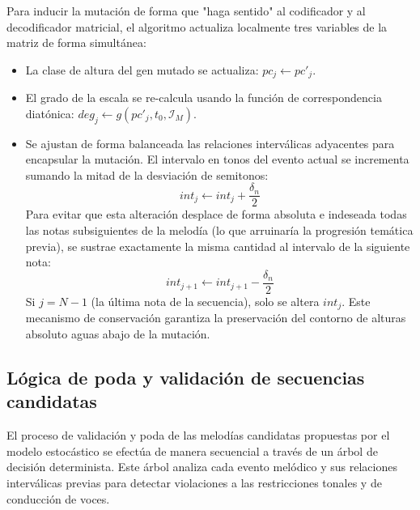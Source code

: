 \documentclass[12pt]{report}
\begin{document}
\begin{enumerate}
    Para inducir la mutación de forma que "haga sentido" al codificador y al decodificador matricial, el algoritmo actualiza localmente tres variables de la matriz de forma simultánea:
    \begin{itemize}
        \item La clase de altura del gen mutado se actualiza: $pc_j \leftarrow pc'_j$.
        \item El grado de la escala se re-calcula usando la función de correspondencia diatónica: $deg_j \leftarrow g(pc'_j, t_0, \mathcal{I}_M)$.
        \item Se ajustan de forma balanceada las relaciones interválicas adyacentes para encapsular la mutación. El intervalo en tonos del evento actual se incrementa sumando la mitad de la desviación de semitonos:
        \begin{equation}
            int_j \leftarrow int_j + \frac{\delta_n}{2}
        \end{equation}
        Para evitar que esta alteración desplace de forma absoluta e indeseada todas las notas subsiguientes de la melodía (lo que arruinaría la progresión temática previa), se sustrae exactamente la misma cantidad al intervalo de la siguiente nota:
        \begin{equation}
            int_{j+1} \leftarrow int_{j+1} - \frac{\delta_n}{2}
        \end{equation}
        Si $j = N-1$ (la última nota de la secuencia), solo se altera $int_j$. Este mecanismo de conservación garantiza la preservación del contorno de alturas absoluto aguas abajo de la mutación.
    \end{itemize}
\end{enumerate}

\subsection{Lógica de poda y validación de secuencias candidatas}

El proceso de validación y poda de las melodías candidatas propuestas por el modelo estocástico se efectúa de manera secuencial a través de un árbol de decisión determinista. Este árbol analiza cada evento melódico y sus relaciones interválicas previas para detectar violaciones a las restricciones tonales y de conducción de voces.
\end{document}

